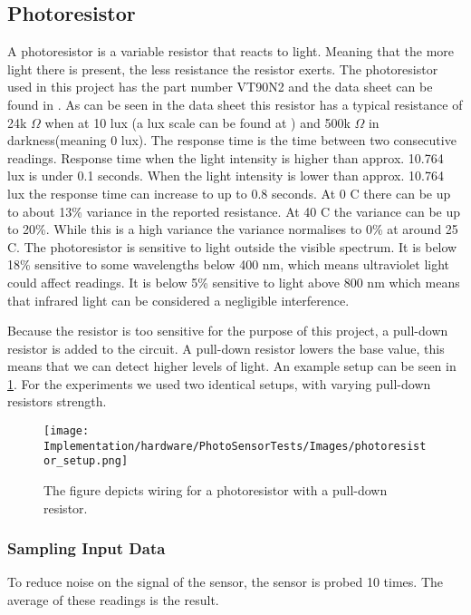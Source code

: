 \subsection{Photoresistor}\label{sub:photoresistor}
A photoresistor is a variable resistor that reacts to light. Meaning that the more light there is present, the less resistance the resistor exerts. The photoresistor used in this project has the part number VT90N2 and the data sheet can be found in \cite{photoresistor_sheet}. As can be seen in the data sheet this resistor has a typical resistance of 24k $\Omega$ when at 10 lux (a lux scale can be found at \cite{lux_scale}) and 500k $\Omega$ in darkness(meaning 0 lux). The response time is the time between two consecutive readings. Response time when the light intensity is higher than approx. 10.764 lux is under 0.1 seconds. When the light intensity is lower than approx. 10.764 lux the response time can increase to up to 0.8 seconds. At 0 \degree C there can be up to about 13\% variance in the reported resistance. At 40 \degree C the variance can be up to 20\%. While this is a high variance the variance normalises to 0\% at around 25 \degree C. The photoresistor is sensitive to light outside the visible spectrum. It is below 18\% sensitive to some wavelengths below 400 nm, which means ultraviolet light could affect readings. It is below 5\% sensitive to light above 800 nm which means that infrared light can be considered a negligible interference.

Because the resistor is too sensitive for the purpose of this project, a pull-down resistor is added to the circuit\cite{pulldown_resistor}. A pull-down resistor lowers the base value, this means that we can detect higher levels of light. An example setup can be seen in \cref{fig:arduino_photoresistor_wiring}. For the experiments we used two identical setups, with varying pull-down resistors strength.

\begin{figure}[htbp]
  \centering
  \texttt{[image: Implementation/hardware/PhotoSensorTests/Images/photoresistor\_setup.png]}
  \caption[Photoresistor]{The figure depicts wiring for a photoresistor with a pull-down resistor.}\label{fig:arduino_photoresistor_wiring}
\end{figure}

\subsubsection{Sampling Input Data}
To reduce noise on the signal of the sensor, the sensor is probed 10 times. The average of these readings is the result.